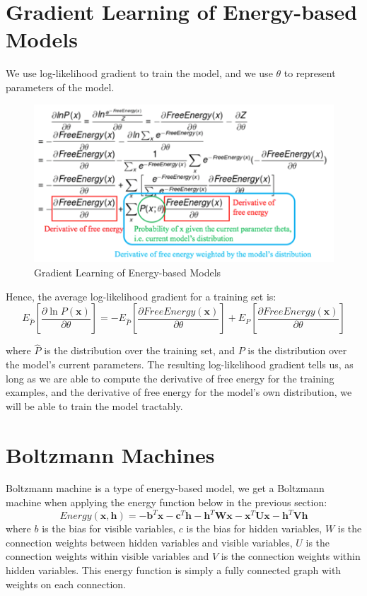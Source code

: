 \documentclass[11pt,fleqn, UTF8]{ctexbook} %
\begin{document}
\section{Gradient Learning of Energy-based Models}
We use log-likelihood gradient to train the model, and we use $\theta$ to represent parameters of the model.
\begin{figure}[t]
 \centering
 \includegraphics{pics/add3.png}
 \caption{Gradient Learning of Energy-based Models}
 \label{fig:add3}
\end{figure}

Hence, the average log-likelihood gradient for a training set is:
\begin{equation}\label{add1.8}
    E_{\hat{P}}\left[ \frac{\partial \ln P(\boldsymbol{x})}{\partial\theta} \right]=-E_{\hat{P}}\left[ \frac{\partial FreeEnergy(\boldsymbol{x})}{\partial\theta} \right]+E_{P}\left[ \frac{\partial FreeEnergy(\boldsymbol{x})}{\partial\theta} \right]
\end{equation}

where $\hat{P}$ is the distribution over the training set, and  $P$ is the distribution over the model's current parameters. The resulting log-likelihood gradient tells us, as long as we are able to compute the derivative of free energy for the training examples, and the derivative of free energy for the model's own distribution, we will be able to train the model tractably.
\section{Boltzmann Machines}
Boltzmann machine is a type of energy-based model, we get a Boltzmann machine when applying the energy function below in the previous section:
\begin{equation}\label{BME}
  Energy(\boldsymbol{x},\boldsymbol{h})=-\boldsymbol{b}^T\boldsymbol{x}-\boldsymbol{c}^T\boldsymbol{h}-\boldsymbol{h}^T\boldsymbol{Wx}-\boldsymbol{x}^T\boldsymbol{Ux}-\boldsymbol{h}^T\boldsymbol{Vh}
\end{equation}
where $b$ is the bias for visible variables, $c$ is the bias for hidden variables, $W$ is the connection weights between hidden variables and visible variables, $U$ is the connection weights within visible variables and $V$ is the connection weights within hidden variables. This energy function is simply a fully connected graph with weights on each connection.
\end{document}
